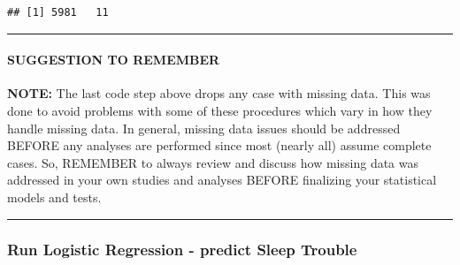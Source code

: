 \documentclass[]{article}
\newenvironment{Shaded}{\begin{snugshade}}{\end{snugshade}}
\newcommand{\KeywordTok}[1]{\textcolor[rgb]{0.13,0.29,0.53}{\textbf{{#1}}}}
\newcommand{\DataTypeTok}[1]{\textcolor[rgb]{0.13,0.29,0.53}{{#1}}}
\newcommand{\DecValTok}[1]{\textcolor[rgb]{0.00,0.00,0.81}{{#1}}}
\newcommand{\StringTok}[1]{\textcolor[rgb]{0.31,0.60,0.02}{{#1}}}
\newcommand{\CommentTok}[1]{\textcolor[rgb]{0.56,0.35,0.01}{\textit{{#1}}}}
\newcommand{\NormalTok}[1]{{#1}}
\let\oldparagraph\paragraph
\renewcommand{\paragraph}[1]{\oldparagraph{#1}\mbox{}}
\begin{document}
\begin{verbatim}
## [1] 5981   11
\end{verbatim}

\begin{center}\rule{0.5\linewidth}{\linethickness}\end{center}

\paragraph{SUGGESTION TO REMEMBER}\label{suggestion-to-remember}

\textbf{NOTE:} The last code step above drops any case with missing
data. This was done to avoid problems with some of these procedures
which vary in how they handle missing data. In general, missing data
issues should be addressed BEFORE any analyses are performed since most
(nearly all) assume complete cases. So, REMEMBER to always review and
discuss how missing data was addressed in your own studies and analyses
BEFORE finalizing your statistical models and tests.

\begin{center}\rule{0.5\linewidth}{\linethickness}\end{center}

\subsubsection{Run Logistic Regression - predict Sleep
Trouble}\label{run-logistic-regression---predict-sleep-trouble}

\begin{Shaded}
\end{Shaded}
\end{document}
